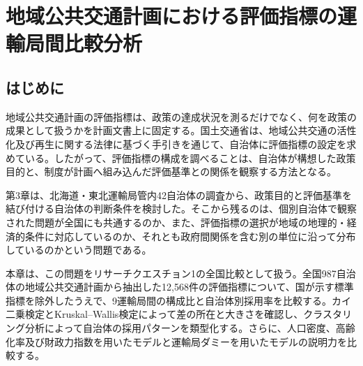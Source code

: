 
\chapter{地域公共交通計画における評価指標の運輸局間比較分析}
\label{chap:regional_transport_comparison}

\graphicspath{{/Volumes/UNTITLED/Obsidian/Academic_Research/doctorthesis/figure/}{/Volumes/UNTITLED/Obsidian/Academic_Research/doctorthesis/figure/ch1/}{/Volumes/UNTITLED/Obsidian/Academic_Research/doctorthesis/figure/ch2/}{/Volumes/UNTITLED/Obsidian/Academic_Research/doctorthesis/figure/ch3/}{/Volumes/UNTITLED/Obsidian/Academic_Research/doctorthesis/figure/ch4/}{/Volumes/UNTITLED/Obsidian/Academic_Research/doctorthesis/figure/ch5/}{/Volumes/UNTITLED/Obsidian/Academic_Research/doctorthesis/figure/ch6/}{../publictransportplan/results/analysis_multi/}}

\section{はじめに}
\label{sec:ch6_intro}

地域公共交通計画の評価指標は、政策の達成状況を測るだけでなく、何を政策の成果として扱うかを計画文書上に固定する。国土交通省は、地域公共交通の活性化及び再生に関する法律に基づく手引きを通じて、自治体に評価指標の設定を求めている\cite{mlit2023}。したがって、評価指標の構成を調べることは、自治体が構想した政策目的と、制度が計画へ組み込んだ評価基準との関係を観察する方法となる。

第3章は、北海道・東北運輸局管内42自治体の調査から、政策目的と評価基準を結び付ける自治体の判断条件を検討した。そこから残るのは、個別自治体で観察された問題が全国にも共通するのか、また、評価指標の選択が地域の地理的・経済的条件に対応しているのか、それとも政府間関係を含む別の単位に沿って分布しているのかという問題である。

本章は、この問題をリサーチクエスチョン1の全国比較として扱う。全国987自治体の地域公共交通計画から抽出した12,568件の評価指標について、国が示す標準指標を除外したうえで、9運輸局間の構成比と自治体別採用率を比較する。カイ二乗検定とKruskal--Wallis検定によって差の所在と大きさを確認し、クラスタリング分析によって自治体の採用パターンを類型化する。さらに、人口密度、高齢化率及び財政力指数を用いたモデルと運輸局ダミーを用いたモデルの説明力を比較する。

